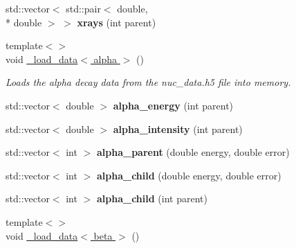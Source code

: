 \begin{DoxyCompactItemize}
\item 
\hypertarget{namespacepyne_a086ed3576eb51bbdc721fbd5754ecf30}{std\+::vector$<$ std\+::pair$<$ double, \\*
double $>$ $>$ {\bfseries xrays} (int parent)}\label{namespacepyne_a086ed3576eb51bbdc721fbd5754ecf30}

\item 
\hypertarget{namespacepyne_a673b0b45ebe0592568a4562122a18bbb}{{\footnotesize template$<$$>$ }\\void \hyperlink{namespacepyne_a673b0b45ebe0592568a4562122a18bbb}{\+\_\+load\+\_\+data$<$ alpha $>$} ()}\label{namespacepyne_a673b0b45ebe0592568a4562122a18bbb}

\begin{DoxyCompactList}\small\item\em Loads the alpha decay data from the nuc\+\_\+data.\+h5 file into memory. \end{DoxyCompactList}\item 
\hypertarget{namespacepyne_a99b2ffce326da5691c5a9845160e2941}{std\+::vector$<$ double $>$ {\bfseries alpha\+\_\+energy} (int parent)}\label{namespacepyne_a99b2ffce326da5691c5a9845160e2941}

\item 
\hypertarget{namespacepyne_a9060c732198093622687083cce03f9a8}{std\+::vector$<$ double $>$ {\bfseries alpha\+\_\+intensity} (int parent)}\label{namespacepyne_a9060c732198093622687083cce03f9a8}

\item 
\hypertarget{namespacepyne_a349b73b8c365292fc2b91d1e4fc64154}{std\+::vector$<$ int $>$ {\bfseries alpha\+\_\+parent} (double energy, double error)}\label{namespacepyne_a349b73b8c365292fc2b91d1e4fc64154}

\item 
\hypertarget{namespacepyne_ad610784cfca1a49090a15daf49fe21c4}{std\+::vector$<$ int $>$ {\bfseries alpha\+\_\+child} (double energy, double error)}\label{namespacepyne_ad610784cfca1a49090a15daf49fe21c4}

\item 
\hypertarget{namespacepyne_a80cd5a9276515010515462d27f500fbc}{std\+::vector$<$ int $>$ {\bfseries alpha\+\_\+child} (int parent)}\label{namespacepyne_a80cd5a9276515010515462d27f500fbc}

\item 
\hypertarget{namespacepyne_ac03b565590e9d917e4f93d65dac36db6}{{\footnotesize template$<$$>$ }\\void \hyperlink{namespacepyne_ac03b565590e9d917e4f93d65dac36db6}{\+\_\+load\+\_\+data$<$ beta $>$} ()}\label{namespacepyne_ac03b565590e9d917e4f93d65dac36db6}


\end{DoxyCompactItemize}
